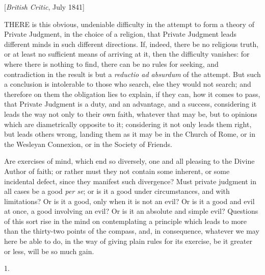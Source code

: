 
[\emph{British Critic}, July 1841]

THERE is this obvious, undeniable
difficulty in the attempt to form a theory of Private Judgment, in the
choice of a religion, that Private Judgment leads different minds in
such different directions. If, indeed, there be no religious truth, or
at least no sufficient means of arriving at it, then the difficulty
vanishes: for where there is nothing to find, there can be no rules
for seeking, and contradiction in the result is but a \emph{reductio ad
absurdum} of the attempt. But such a conclusion is intolerable to
those who search, else they would not search; and therefore on them
the obligation lies to explain, if they can, how it comes to pass,
that Private Judgment is a duty, and an advantage, and a success,
considering it leads the way not only to their own faith, whatever
that may be, but to opinions which are diametrically opposite to it;
considering it not only leads them right, but leads others wrong,
landing them as it may be in the Church of Rome, or in the Wesleyan
Connexion, or in the Society of Friends.

Are exercises of mind, which end so diversely, one and all pleasing
to the Divine Author of faith; or rather must they not contain some
inherent, or some incidental defect, since they manifest such
divergence? Must private judgment in all cases be a good \emph{per se};
or is it a good under circumstances, and with limitations? Or is
it a good, only when it is not an evil? Or is it a good and evil at
once, a good involving an evil? Or is it an absolute and simple evil?
Questions of this sort rise in the mind on contemplating a principle
which leads to more than the thirty-two points of the compass, and, in
consequence, whatever we may here be able to do, in the way of giving
plain rules for its exercise, be it greater or less, will be so much
gain.

1.

